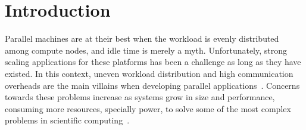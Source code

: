 \section{Introduction}


%
%
%
%
%
%
%
%
%

Parallel machines are at their best when the workload is evenly distributed among compute nodes, and idle time is merely a myth.
Unfortunately, strong scaling applications for these platforms has been a challenge as long as they have existed.
In this context, uneven workload distribution and high communication overheads are the main villains when developing parallel applications~\cite{Deveci2015, commaware}.
Concerns towards these problems increase as systems grow in size and performance, consuming more resources, specially power, to solve some of the most complex problems in scientific computing~\cite{exapower2015,padoin2017energy}.

